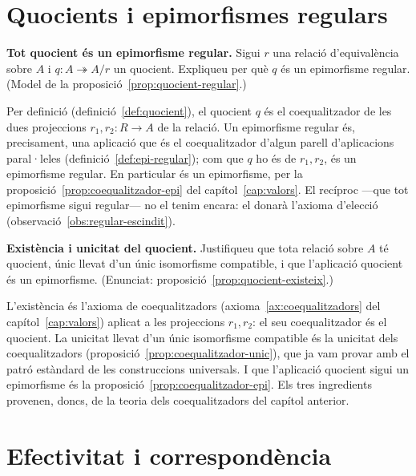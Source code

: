 \section{Quocients i epimorfismes regulars}\label{prac:quocients}

\begin{exercici}
\textbf{Tot quocient és un epimorfisme regular.} Sigui \(r\) una relació d'equivalència sobre \(A\) i \(q\colon A\twoheadrightarrow A/r\) un quocient. Expliqueu per què \(q\) és un epimorfisme regular. (Model de la proposició~\ref{prop:quocient-regular}.)
\end{exercici}
\begin{solucio}
Per definició (definició~\ref{def:quocient}), el quocient \(q\) és el coequalitzador de les dues projeccions \(r_1,r_2\colon R\to A\) de la relació. Un epimorfisme regular és, precisament, una aplicació que és el coequalitzador d'algun parell d'aplicacions paral·leles (definició~\ref{def:epi-regular}); com que \(q\) ho és de \(r_1,r_2\), és un epimorfisme regular. En particular és un epimorfisme, per la proposició~\ref{prop:coequalitzador-epi} del capítol~\ref{cap:valors}. El recíproc ---que tot epimorfisme sigui regular--- no el tenim encara: el donarà l'axioma d'elecció (observació~\ref{obs:regular-escindit}).
\end{solucio}

\begin{exercici}
\textbf{Existència i unicitat del quocient.} Justifiqueu que tota relació sobre \(A\) té quocient, únic llevat d'un únic isomorfisme compatible, i que l'aplicació quocient és un epimorfisme. (Enunciat: proposició~\ref{prop:quocient-existeix}.)
\end{exercici}
\begin{solucio}
L'existència és l'axioma de coequalitzadors (axioma~\ref{ax:coequalitzadors} del capítol~\ref{cap:valors}) aplicat a les projeccions \(r_1,r_2\): el seu coequalitzador és el quocient. La unicitat llevat d'un únic isomorfisme compatible és la unicitat dels coequalitzadors (proposició~\ref{prop:coequalitzador-unic}), que ja vam provar amb el patró estàndard de les construccions universals. I que l'aplicació quocient sigui un epimorfisme és la proposició~\ref{prop:coequalitzador-epi}. Els tres ingredients provenen, doncs, de la teoria dels coequalitzadors del capítol anterior.
\end{solucio}

\section{Efectivitat i correspondència}\label{prac:efectivitat}

